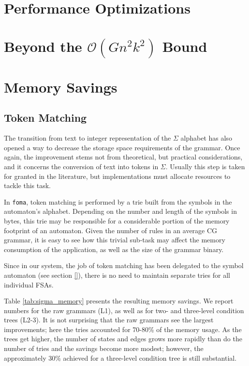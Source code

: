 \documentclass{article}
\begin{document}
\section{Performance Optimizations}
\label{sec:speed}

\section{Beyond the $\mathcal{O}(Gn^2k^2)$ Bound}
\label{sec:idea}

\section{Memory Savings}
\label{sec:memory}

\subsection{Token Matching}
\label{sec:sub_token}

The transition from text to integer representation of the $\Sigma$ alphabet
has also opened a way to decrease the storage space requirements of the grammar.
Once again, the improvement stems not from theoretical, but practical
considerations, and it concerns the conversion of text into tokens in $\Sigma$.
Usually this step is taken for granted in the literature, but implementations
must allocate resources to tackle this task.  %

In \texttt{foma}, token matching is performed by a trie built from the symbols
in the automaton's alphabet. Depending on the number and length of the symbols
in bytes, this trie may be responsible for a considerable portion of the memory
footprint of an automaton. Given the number of rules in an average CG grammar,
it is easy to see how this trivial sub-task may affect the memory consumption of
the application, as well as the size of the grammar binary.

Since in our system, the job of token matching has been delegated to the symbol
automaton (see section \ref{}), there is no need to maintain separate tries for
all individual FSAs. 

Table \ref{tab:sigma_memory} presents the resulting memory savings.
We report numbers for the raw grammars (L1), as well as for two- and three-level
condition trees (L2-3). It is not surprising that the raw grammars see the
largest improvements; here the tries accounted for 70-80\% of the memory
usage. As the trees get higher, the number of states and edges grows more
rapidly than do the number of tries and the savings become more modest; however,
the approximately 30\% achieved for a three-level condition tree is still
substantial.  %
\end{document}
